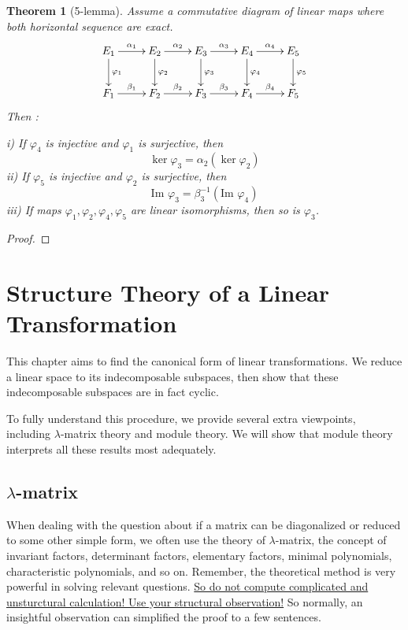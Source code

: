 \documentclass{book}
\newtheorem{theorem}{Theorem}[section]
\theoremstyle{definition}
\begin{document}
\begin{theorem}[5-lemma]
Assume a commutative diagram of linear maps where both horizontal sequence are exact.
\[\xymatrix{
E_1 \ar[r]^{\alpha_1} \ar[d]^{\varphi_1} & E_2 \ar[r]^{\alpha_2} \ar[d]^{\varphi_2} & E_3 \ar[r]^{\alpha_3} \ar[d]^{\varphi_3} & E_4 \ar[r]^{\alpha_4} \ar[d]^{\varphi_4} & E_5 \ar[d]^{\varphi_5}\\
F_1 \ar[r]^{\beta_1} & F_2 \ar[r]^{\beta_2} & F_3 \ar[r]^{\beta_3} & F_4 \ar[r]^{\beta_4} &F_5}\]
Then :\par
i) If $\varphi_4$ is injective and $\varphi_1$ is surjective, then \[\ker \varphi_3= \alpha_2( \ker \varphi_2 )\]
ii) If $\varphi_5$ is injective and $\varphi_2$ is surjective, then \[ \text{Im } \varphi_3=\beta_3^{-1} (\text{Im } \varphi_4) \]
iii) If maps $\varphi_1,\varphi_2,\varphi_4,\varphi_5$ are linear isomorphisms, then so is $\varphi_3$. 
\end{theorem}
\begin{proof}

\end{proof}

\chapter{Structure Theory of a Linear Transformation}
This chapter aims to find the canonical form of linear transformations. We reduce a linear space to its indecomposable subspaces, then show that these indecomposable subspaces are in fact cyclic. \par
To fully understand this procedure, we provide several extra viewpoints, including $\lambda$-matrix theory and module theory. We will show that module theory interprets all these results most adequately.
\section{$\lambda$-matrix}
When dealing with the question about if a matrix can be diagonalized or reduced to some other simple form, we often use the theory of $\lambda$-matrix, the concept of invariant factors, determinant factors, elementary factors,  minimal polynomials, characteristic polynomials, and so on. Remember, the theoretical method is very powerful in solving relevant questions. \underline{So do not compute complicated and}
\underline{unsturctural calculation! Use your structural observation!} So normally, an insightful observation can simplified the proof to a few sentences.
\end{document}
